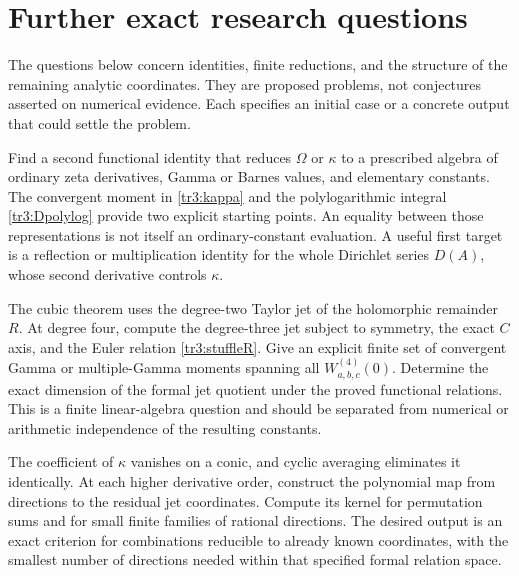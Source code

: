 \section{Further exact research questions}
\label{research:section}

The questions below concern identities, finite reductions, and the
structure of the remaining analytic coordinates. They are proposed
problems, not conjectures asserted on numerical evidence. Each specifies
an initial case or a concrete output that could settle the problem.

\begin{question}
Find a second functional identity that reduces $\Omega$ or $\kappa$
to a prescribed algebra of ordinary zeta derivatives, Gamma or Barnes
values, and elementary constants. The convergent moment in
\eqref{tr3:kappa} and the polylogarithmic integral
\eqref{tr3:Dpolylog} provide two explicit starting points. An equality
between those representations is not itself an ordinary-constant
evaluation. A useful first target is a reflection or multiplication
identity for the whole Dirichlet series $D(A)$, whose second derivative
controls $\kappa$.
\end{question}

\begin{question}
The cubic theorem uses the degree-two Taylor jet of the holomorphic
remainder $R$. At degree four, compute the degree-three jet subject
to symmetry, the exact $C$ axis, and the Euler relation
\eqref{tr3:stuffleR}. Give an explicit finite set of convergent Gamma
or multiple-Gamma moments spanning all $W^{(4)}_{a,b,c}(0)$.
Determine the exact dimension of the formal jet quotient under the
proved functional relations. This is a finite linear-algebra question
and should be separated from numerical or arithmetic independence
of the resulting constants.
\end{question}

\begin{question}
The coefficient of $\kappa$ vanishes on a conic, and cyclic averaging
eliminates it identically. At each higher derivative order, construct
the polynomial map from directions to the residual jet coordinates.
Compute its kernel for permutation sums and for small finite families
of rational directions. The desired output is an exact criterion
for combinations reducible to already known coordinates, with the
smallest number of directions needed within that specified formal
relation space.
\end{question}


